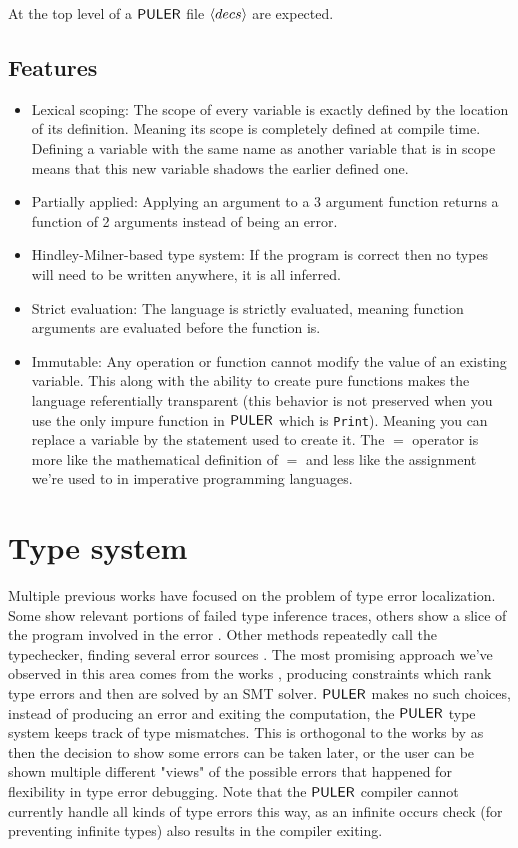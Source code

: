 At the top level of a $\mathsf{PULER}$ file $\langle decs \rangle$ are expected.

\subsection{Features}\label{features}
    \begin{itemize}
        \item Lexical scoping: The scope of every variable is exactly defined by the location of its definition. Meaning its scope is completely defined at compile time. Defining a variable with the same name as another variable that is in scope means that this new variable shadows the earlier defined one.
        \item Partially applied: Applying an argument to a 3 argument function returns a function of 2 arguments instead of being an error.
        \item Hindley-Milner-based type system: If the program is correct then no types will need to be written anywhere, it is all inferred.
        \item Strict evaluation: The language is strictly evaluated, meaning function arguments are evaluated before the function is.
        \item Immutable: Any operation or function cannot modify the value of an existing variable. This along with the ability to create pure functions makes the language referentially transparent (this behavior is not preserved when you use the only impure function in $\mathsf{PULER}$ which is \texttt{Print}). Meaning you can replace a variable by the statement used to create it. The $=$ operator is more like the mathematical definition of $=$ and less like the assignment we're used to in imperative programming languages.
    \end{itemize}

\section{Type system}\label{type-system}
Multiple previous works have focused on the problem of type error localization.
Some show relevant portions of failed type inference traces\cite{DUGGAN199637, type_errors_src}, others show a slice of the program involved in the error \cite{Gast2005, slicing_type_errors}.
Other methods repeatedly call the typechecker, finding several error sources \cite{constraint_errors}.
The most promising approach we've observed in this area comes from the works \citet{min_type_error, type_error_diagnose}, producing constraints which rank type errors and then are solved by an SMT solver.
$\mathsf{PULER}$ makes no such choices, instead of producing an error and exiting the computation, the $\mathsf{PULER}$ type system keeps track of type mismatches.
This is orthogonal to the works by \citet{min_type_error} as then the decision to show some errors can be taken later, or the user can be shown multiple different "views" of the possible errors that happened for flexibility in type error debugging.
Note that the $\mathsf{PULER}$ compiler cannot currently handle all kinds of type errors this way, as an infinite occurs check (for preventing infinite types) also results in the compiler exiting.


